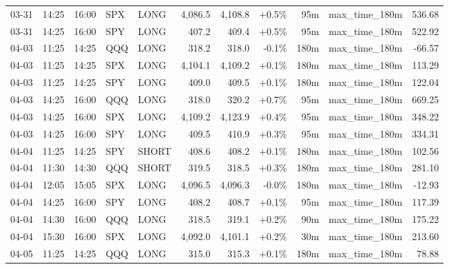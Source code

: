 \documentclass[11pt,a4paper,twoside]{article}
\begin{document}
\begin{center}
\begin{longtable}{>{\color{txtmain}}l l l l l r r r r >{\color{txtmain}}l r}
03-31 & 14:25 & 16:00 & SPX & LONG & 4,086.5 & 4,108.8 & \textcolor{wingreen}{+0.5\%} & 95m & max\_time\_180m & \textcolor{wingreen}{536.68} \\
03-31 & 14:25 & 16:00 & SPY & LONG & 407.2 & 409.4 & \textcolor{wingreen}{+0.5\%} & 95m & max\_time\_180m & \textcolor{wingreen}{522.92} \\
04-03 & 11:25 & 14:25 & QQQ & LONG & 318.2 & 318.0 & \textcolor{lossred}{-0.1\%} & 180m & max\_time\_180m & \textcolor{lossred}{-66.57} \\
04-03 & 11:25 & 14:25 & SPX & LONG & 4,104.1 & 4,109.2 & \textcolor{wingreen}{+0.1\%} & 180m & max\_time\_180m & \textcolor{wingreen}{113.29} \\
04-03 & 11:25 & 14:25 & SPY & LONG & 409.0 & 409.5 & \textcolor{wingreen}{+0.1\%} & 180m & max\_time\_180m & \textcolor{wingreen}{122.04} \\
04-03 & 14:25 & 16:00 & QQQ & LONG & 318.0 & 320.2 & \textcolor{wingreen}{+0.7\%} & 95m & max\_time\_180m & \textcolor{wingreen}{669.25} \\
04-03 & 14:25 & 16:00 & SPX & LONG & 4,109.2 & 4,123.9 & \textcolor{wingreen}{+0.4\%} & 95m & max\_time\_180m & \textcolor{wingreen}{348.22} \\
04-03 & 14:25 & 16:00 & SPY & LONG & 409.5 & 410.9 & \textcolor{wingreen}{+0.3\%} & 95m & max\_time\_180m & \textcolor{wingreen}{334.31} \\
04-04 & 11:25 & 14:25 & SPY & SHORT & 408.6 & 408.2 & \textcolor{wingreen}{+0.1\%} & 180m & max\_time\_180m & \textcolor{wingreen}{102.56} \\
04-04 & 11:30 & 14:30 & QQQ & SHORT & 319.5 & 318.5 & \textcolor{wingreen}{+0.3\%} & 180m & max\_time\_180m & \textcolor{wingreen}{281.10} \\
04-04 & 12:05 & 15:05 & SPX & LONG & 4,096.5 & 4,096.3 & \textcolor{lossred}{-0.0\%} & 180m & max\_time\_180m & \textcolor{lossred}{-12.93} \\
04-04 & 14:25 & 16:00 & SPY & LONG & 408.2 & 408.7 & \textcolor{wingreen}{+0.1\%} & 95m & max\_time\_180m & \textcolor{wingreen}{117.39} \\
04-04 & 14:30 & 16:00 & QQQ & LONG & 318.5 & 319.1 & \textcolor{wingreen}{+0.2\%} & 90m & max\_time\_180m & \textcolor{wingreen}{175.22} \\
04-04 & 15:30 & 16:00 & SPX & LONG & 4,092.0 & 4,101.1 & \textcolor{wingreen}{+0.2\%} & 30m & max\_time\_180m & \textcolor{wingreen}{213.60} \\
04-05 & 11:25 & 14:25 & QQQ & LONG & 315.0 & 315.3 & \textcolor{wingreen}{+0.1\%} & 180m & max\_time\_180m & \textcolor{wingreen}{78.88} \\

\end{longtable}
\end{center}
\end{document}

